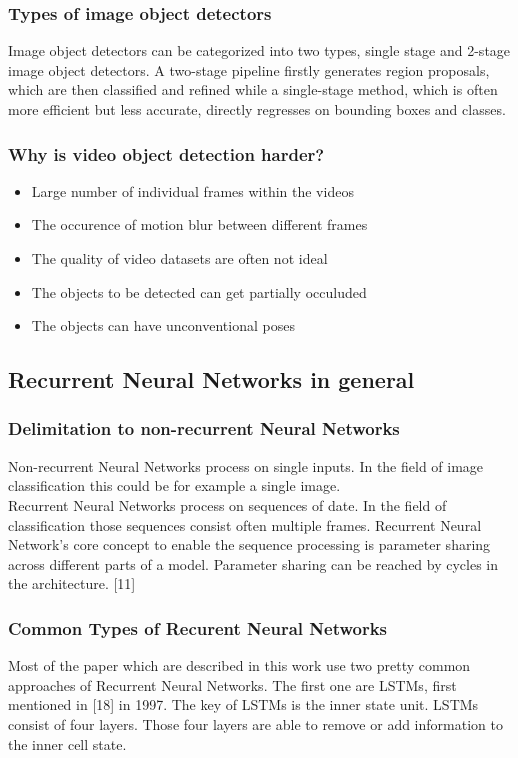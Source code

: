 \documentclass[conference]{IEEEtran}
\begin{document}
\subsubsection{Types of image object detectors} 
Image object detectors can be categorized into two types, single stage and 2-stage image object detectors. A two-stage pipeline firstly generates region proposals, which are then classified and refined\cite{b17} while a single-stage method, which is often more efficient but less accurate, directly regresses on bounding boxes and classes\cite{b18}\cite{b19}. \newline

\subsubsection{Why is video object detection harder?} 
	\begin{itemize}
		\item Large number of individual frames within the videos
		\item The occurence of motion blur between different frames
		\item The quality of video datasets are often not ideal
		\item The objects to be detected can get partially occuluded
		\item The objects can have unconventional poses
	\end{itemize}

\subsection{Recurrent Neural Networks in general}
\subsubsection{Delimitation to non-recurrent Neural Networks} 
Non-recurrent Neural Networks process on single inputs. In the field of image classification this could be for example a single image. \\
Recurrent Neural Networks process on sequences of date. In the field of classification those sequences consist often multiple frames. Recurrent Neural Network's core concept to enable the sequence processing is parameter sharing across different parts of a model. Parameter sharing can be reached by cycles in the architecture. [11] \newline

\subsubsection{Common Types of Recurent Neural Networks}
Most of the paper which are described in this work use two pretty common approaches of Recurrent Neural Networks. The first one are LSTMs, first mentioned in [18] in 1997. The key of LSTMs is the inner state unit. LSTMs consist of four layers. Those four layers are able to remove or add information to the inner cell state.  \newline
\end{document}
